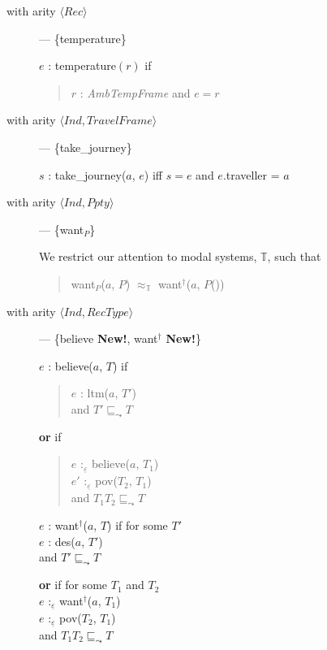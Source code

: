 \begin{description}
\begin{description}
  

  
\item[with arity \textnormal{$\langle\textit{Rec}\rangle$}] ---
  \{temperature\}
  
$e$ : temperature$(r)$ if 
  \begin{quote}
    $r$ : \textit{AmbTempFrame} and $e=r$
  \end{quote}

  
\item[with arity
  \textnormal{$\langle\textit{Ind},\textit{TravelFrame}\rangle$}] ---
  \{take\_journey\}

  $s$ : take\_journey($a$, $e$) iff $s=e$ and $e$.traveller = $a$

  
\item[with arity
  \textnormal{$\langle\textit{Ind},\textit{Ppty}\rangle$}] ---
  \{want$_P$\}

 We restrict our attention to modal systems, $\mathbb{T}$, such
 that
 \begin{quote}
   want$_P$($a$, $P$) $\approx_{\mathbb{T}}$ want$^\dagger$($a$,
   $P$())
 \end{quote}
  

\item[with arity
  \textnormal{$\langle\textit{Ind},\textit{RecType}\rangle$}]
  --- \{believe \textbf{New!}, want$^{\dagger}$ \textbf{New!}\}

  $e$ : believe($a$, $T$) if
  \begin{quote}
    $e$ : ltm($a$, $T'$) \\
    and $T'\sqsubseteq_{\leadsto}T$
  \end{quote}
  \textbf{or} if
  \begin{quote}
    $e$ :$_{\underline{\varepsilon}}$ believe($a$, $T_1$)\\
    $e'$ :$_{\underline{\varepsilon}}$ pov($T_2$, $T_1$)\\
    and $T_1$\fbox{\d{$\wedge$}}$T_2 \sqsubseteq_{\leadsto}T$
  \end{quote}

  \bigskip

  $e$ : want$^{\dagger}$($a$, $T$) if for some $T'$\\
  \hspace*{2em} $e$ : des($a$, $T'$) \\
  \hspace*{2em} and $T'\sqsubseteq_{\leadsto}T$

  \textbf{or} if for some $T_1$ and $T_2$\\
  \hspace*{2em} $e$ :$_{\underline{\varepsilon}}$ want$^{\dagger}$($a$, $T_1$)\\
  \hspace*{2em} $e$ :$_{\underline{\varepsilon}}$ pov($T_2$, $T_1$) \\
  \hspace*{2em} and $T_1$\fbox{\d{$\wedge$}}$T_2
  \sqsubseteq_{\leadsto}T$
  

\end{description}
\end{description}

